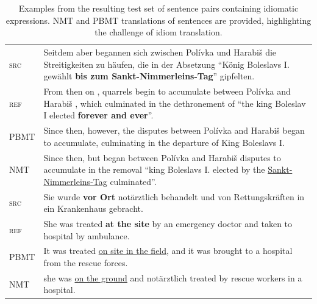   \begin{table}[htbp]
\begin{center}
 \caption{Examples from the resulting test set of sentence pairs containing idiomatic expressions. NMT and PBMT translations of sentences are provided, highlighting the challenge of idiom translation.  \label{smtnmt}}
 \begin{tabularx}{0.95\linewidth}{lX}
       \toprule
 \textsc{src} &   Seitdem aber begannen sich zwischen Pol\'{i}vka und Harabi\v{s} die Streitigkeiten zu h\"{a}ufen, die in der Absetzung ``K\"{o}nig Boleslavs I. gew\"{a}hlt \textbf{bis zum Sankt-Nimmerleins-Tag}'' gipfelten. \\
       \textsc{ref} &  From then on , quarrels begin to accumulate between Pol\'{i}vka and Harabi\v{s} , which culminated in the dethronement of ``the king Boleslav I elected \textbf{forever and ever}''.   \\
       PBMT  &  Since then, however, the disputes between Pol\'{i}vka and Harabi\v{s} began to accumulate, culminating in the departure of King Boleslavs I.   \\
       NMT  &   Since then, but began between Pol\'{i}vka and Harabi\v{s} disputes to accumulate in the removal ``king Boleslavs I. elected by the \underline{Sankt-Nimmerleins-Tag} culminated''.    \\
              \midrule
 \textsc{src} &   Sie wurde \textbf{vor Ort} not\"{a}rztlich behandelt und von Rettungskr\"{a}ften in ein Krankenhaus gebracht. \\
       \textsc{ref} &   She was treated \textbf{at the site} by an emergency doctor and taken to hospital by ambulance.  \\
       PBMT  &  It was treated \underline{on site in the field}, and it was brought to a hospital from the rescue forces.   \\
       NMT  &   she was \underline{on the ground} and not\"{a}rztlich treated by rescue workers in a hospital.    \\

\end{tabularx}
\end{center}
\end{table}
